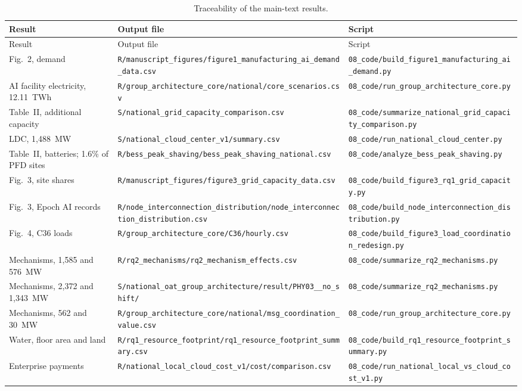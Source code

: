 \documentclass[11pt]{article}
\begin{document}
{\small
\begin{longtable}{@{}L{0.20\textwidth}L{0.44\textwidth}L{0.30\textwidth}@{}}
\caption{Traceability of the main-text results.}\label{tab:trace}\\
\toprule
Result & Output file & Script \\
\midrule
\endfirsthead
\toprule
Result & Output file & Script \\
\midrule
\endhead
\bottomrule
\endfoot
Fig.~2, demand & \nolinkurl{R/manuscript_figures/figure1_manufacturing_ai_demand_data.csv} & \nolinkurl{08_code/build_figure1_manufacturing_ai_demand.py} \\
AI facility electricity, 12.11~TWh & \nolinkurl{R/group_architecture_core/national/core_scenarios.csv} & \nolinkurl{08_code/run_group_architecture_core.py} \\
Table~II, additional capacity & \nolinkurl{S/national_grid_capacity_comparison.csv} & \nolinkurl{08_code/summarize_national_grid_capacity_comparison.py} \\
LDC, 1,488~MW & \nolinkurl{S/national_cloud_center_v1/summary.csv} & \nolinkurl{08_code/run_national_cloud_center.py} \\
Table~II, batteries; 1.6\% of PFD sites & \nolinkurl{R/bess_peak_shaving/bess_peak_shaving_national.csv} & \nolinkurl{08_code/analyze_bess_peak_shaving.py} \\
Fig.~3, site shares & \nolinkurl{R/manuscript_figures/figure3_grid_capacity_data.csv} & \nolinkurl{08_code/build_figure3_rq1_grid_capacity.py} \\
Fig.~3, Epoch AI records & \nolinkurl{R/node_interconnection_distribution/node_interconnection_distribution.csv} & \nolinkurl{08_code/build_node_interconnection_distribution.py} \\
Fig.~4, C36 loads & \nolinkurl{R/group_architecture_core/C36/hourly.csv} & \nolinkurl{08_code/build_figure3_load_coordination_redesign.py} \\
Mechanisms, 1,585 and 576~MW & \nolinkurl{R/rq2_mechanisms/rq2_mechanism_effects.csv} & \nolinkurl{08_code/summarize_rq2_mechanisms.py} \\
Mechanisms, 2,372 and 1,343~MW & \nolinkurl{S/national_oat_group_architecture/result/PHY03__no_shift/} & \nolinkurl{08_code/summarize_rq2_mechanisms.py} \\
Mechanisms, 562 and 30~MW & \nolinkurl{R/group_architecture_core/national/msg_coordination_value.csv} & \nolinkurl{08_code/run_group_architecture_core.py} \\
Water, floor area and land & \nolinkurl{R/rq1_resource_footprint/rq1_resource_footprint_summary.csv} & \nolinkurl{08_code/build_rq1_resource_footprint_summary.py} \\
Enterprise payments & \nolinkurl{R/national_local_cloud_cost_v1/cost/comparison.csv} & \nolinkurl{08_code/run_national_local_vs_cloud_cost_v1.py} \\
\end{longtable}}
\end{document}
